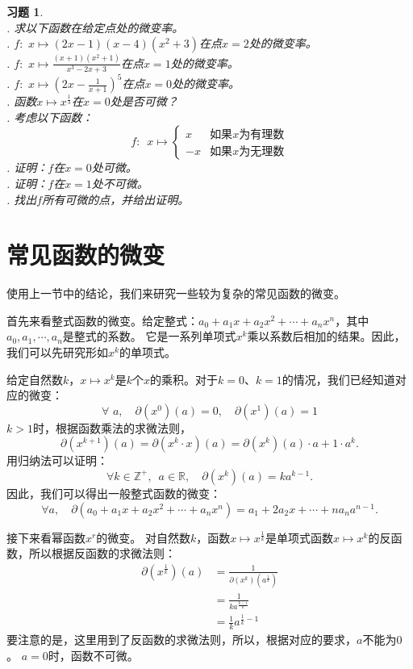 \documentclass[12pt,UTF8]{ctexbook}
\theoremstyle{definition}
\theoremstyle{plain}
\newtheorem{xt}{习题}[section]
\begin{document}
\begin{xt}
    \mbox{} \\
    . 求以下函数在给定点处的微变率。\\
    . $f: \,\, x \mapsto (2x - 1)(x -4)(x^2 + 3)$在点$x = 2$处的微变率。\\
    . $f: \,\, x \mapsto \frac{(x + 1)(x^2 + 1)}{x^3 - 2x + 3}$在点$x = 1$处的微变率。\\
    . $f: \,\, x \mapsto (2x - \frac{1}{x + 1})^5$在点$x = 0$处的微变率。\\
    . 函数$x \mapsto x^{\frac{1}{3}}$在$x = 0$处是否可微？\\
    . 考虑以下函数：
    $$ f: \,\,\, x\mapsto \left\{
        \begin{array}{cl}
            x & \mbox{如果}x\mbox{为有理数} \\
            -x & \mbox{如果}x\mbox{为无理数} 
        \end{array}\right.
    $$
    . 证明：$f$在$x = 0$处可微。\\
    . 证明：$f$在$x = 1$处不可微。\\
    . 找出$f$所有可微的点，并给出证明。
\end{xt}

\section{常见函数的微变}

使用上一节中的结论，我们来研究一些较为复杂的常见函数的微变。

首先来看整式函数的微变。给定整式：$a_0 + a_1 x + a_2 x^2 + \cdots + a_n x^n$，其中$a_0, a_1, \cdots , a_n$是整式的系数。
它是一系列单项式$x^k$乘以系数后相加的结果。因此，我们可以先研究形如$x^k$的单项式。

给定自然数$k$，$x\mapsto x^k$是$k$个$x$的乘积。对于$k=0$、$k=1$的情况，我们已经知道对应的微变：
$$ \forall \,\, a, \quad \partial (x^0) (a) = 0, \quad \partial (x^1) (a) = 1 $$
$k > 1$时，根据函数乘法的求微法则，
$$ \partial (x^{k+1}) (a) = \partial (x^{k} \cdot x) (a) = \partial (x^k) (a) \cdot a + 1 \cdot a^k. $$
用归纳法可以证明：
$$ \forall k \in \mathbb{Z}^+, \,\,\, a\in \mathbb{R}, \quad \partial (x^k) (a) = k a^{k-1}. $$
因此，我们可以得出一般整式函数的微变：
$$ \forall a, \quad \partial (a_0 + a_1 x + a_2 x^2 + \cdots + a_n x^n) = a_1 + 2 a_2 x + \cdots + n a_n a^{n-1}. $$

接下来看幂函数$x^r$的微变。
对自然数$k$，函数$x \mapsto x^{\frac{1}{k}}$是单项式函数$x\mapsto x^k$的反函数，所以根据反函数的求微法则：
\begin{align*}
    \partial (x^{\frac{1}{k}}) (a) &= \frac{1}{\partial (x^k) (a^{\frac{1}{k}})}  \\
    &= \frac{1}{k a^{\frac{k-1}{k}}}  \\
    &= \frac{1}{k} a^{\frac{1}{k} - 1} 
\end{align*}
要注意的是，这里用到了反函数的求微法则，所以，根据对应的要求，$a$不能为$0$。
$a = 0$时，函数不可微。
\end{document}
